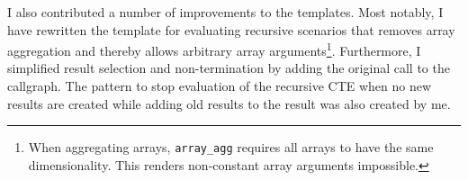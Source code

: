 I also contributed a number of improvements to the templates. Most notably, I have rewritten the template for evaluating recursive scenarios that removes array aggregation and thereby allows arbitrary array arguments\footnote{When aggregating arrays, \texttt{array\_agg} requires all arrays to have the same dimensionality. This renders non-constant array arguments impossible.}. Furthermore, I simplified result selection and non-termination by adding the original call to the callgraph. The pattern to stop evaluation of the recursive CTE when no new results are created while adding old results to the result was also created by me.


